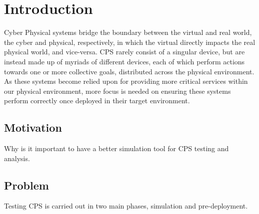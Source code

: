 \chapter{Introduction}



Cyber Physical systems bridge the boundary between the virtual and real world, the cyber and physical, respectively, in which the virtual directly impacts the real physical world, and vice-versa.
CPS rarely consist of a singular device, but are instead made up of myriads of different devices, each of which perform actions towards one or more collective goals, distributed across the physical environment.
As these systems become relied upon for providing more critical services within our physical environment, more focus is needed on ensuring these systems perform correctly once deployed in their target environment.


\section{Motivation}%
\label{sec:Motivation}
Why is it important to have a better simulation tool for CPS testing and analysis.

\section{Problem}
\label{sec:Problem}


Testing CPS is carried out in two main phases, simulation and pre-deployment. 

